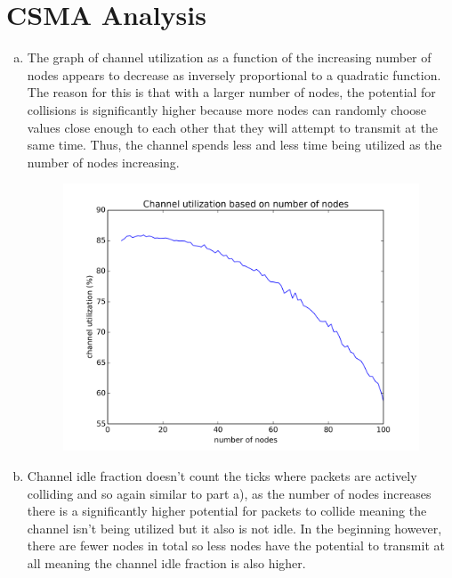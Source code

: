 \documentclass[11pt]{article}
\begin{document}


\section*{CSMA Analysis}

\begin{enumerate}[a.]
\item The graph of channel utilization as a function of the increasing number of nodes appears to decrease as inversely proportional to a quadratic function. The reason for this is that with a larger number of nodes, the potential for collisions is significantly higher because more nodes can randomly choose values close enough to each other that they will attempt to transmit at the same time. Thus, the channel spends less and less time being utilized as the number of nodes increasing.

\begin{figure}[h]
\centering
\includegraphics[width=.9\textwidth]{partA.png}
\caption{}
\end{figure}

\newpage

\vspace*{2mm}
\item Channel idle fraction doesn’t count the ticks where packets are actively colliding and so again similar to part a), as the number of nodes increases there is a significantly higher potential for packets to collide meaning the channel isn’t being utilized but it also is not idle. In the beginning however, there are fewer nodes in total so less nodes have the potential to transmit at all meaning the channel idle fraction is also higher.



\end{enumerate}
\end{document}
